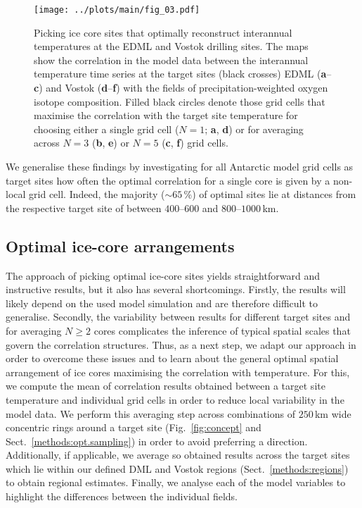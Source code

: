 \documentclass[cp, manuscript]{copernicus}
\begin{document}
\begin{figure*}[t]%
\centering
\texttt{[image: ../plots/main/fig\_03.pdf]}
\caption[Picking optimal sites]{%
  Picking ice core sites that optimally reconstruct interannual temperatures at
  the EDML and Vostok drilling sites. The maps show the correlation in the model
  data between the interannual temperature time series at the target sites
  (black crosses) EDML (\textbf{a}--\textbf{c}) and Vostok
  (\textbf{d}--\textbf{f}) with the fields of precipitation-weighted oxygen
  isotope composition. Filled black circles denote those grid cells that
  maximise the correlation with the target site temperature for choosing either
  a single grid cell ($N=1$; \textbf{a}, \textbf{d}) or for averaging across
  $N=3$ (\textbf{b}, \textbf{e}) or $N=5$ (\textbf{c}, \textbf{f}) grid cells.}
\label{fig:picking}%
\end{figure*}%

We generalise these findings by investigating for all Antarctic model grid cells
as target sites how often the optimal correlation for a single core is given by
a non-local grid cell. Indeed, the majority ($\sim65$\,\%) of optimal sites lie
at distances from the respective target site of between $400$--$600$ and
$800$--$1000$\,km.

\subsection{Optimal ice-core arrangements}
\label{results:optim-spacing}

The approach of picking optimal ice-core sites yields straightforward and
instructive results, but it also has several shortcomings. Firstly, the results
will likely depend on the used model simulation and are therefore difficult to
generalise. Secondly, the variability between results for different target sites
and for averaging $N\ge2$ cores complicates the inference of typical spatial
scales that govern the correlation structures. Thus, as a next step, we adapt
our approach in order to overcome these issues and to learn about the general
optimal spatial arrangement of ice cores maximising the correlation with
temperature. For this, we compute the mean of correlation results obtained
between a target site temperature and individual grid cells in order to reduce
local variability in the model data. We perform this averaging step across
combinations of $250$\,km wide concentric rings around a target site
(Fig.~\ref{fig:concept} and Sect.~\ref{methods:opt.sampling}) in order to avoid
preferring a direction. Additionally, if applicable, we average so obtained
results across the target sites which lie within our defined DML and Vostok
regions (Sect.~\ref{methods:regions}) to obtain regional estimates. Finally, we
analyse each of the model variables to highlight the differences between the
individual fields.
\end{document}
